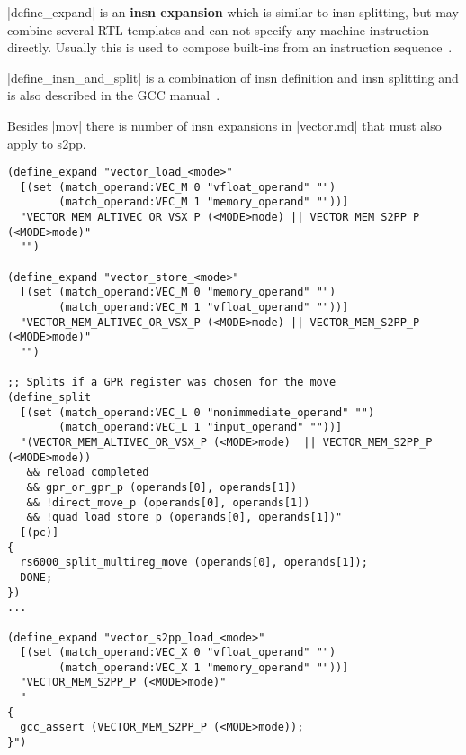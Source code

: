 |define_expand| is an \textbf{insn expansion} which is similar to insn splitting, but may combine several \ac{RTL} templates and can not specify any machine instruction directly.
Usually this is used to compose built-ins from an instruction sequence~\citep[ch.~16.15]{GCCint}.

|define_insn_and_split| is a combination of insn definition and insn splitting and is also described in the \ac{GCC} manual~\citep[ch.~16.16]{GCCint}.

Besides |mov| there is number of insn expansions in |vector.md| that must also apply to s2pp.
\begin{lstlisting}
(define_expand "vector_load_<mode>"
  [(set (match_operand:VEC_M 0 "vfloat_operand" "")
        (match_operand:VEC_M 1 "memory_operand" ""))]
  "VECTOR_MEM_ALTIVEC_OR_VSX_P (<MODE>mode) || VECTOR_MEM_S2PP_P (<MODE>mode)"
  "")

(define_expand "vector_store_<mode>"
  [(set (match_operand:VEC_M 0 "memory_operand" "")
        (match_operand:VEC_M 1 "vfloat_operand" ""))]
  "VECTOR_MEM_ALTIVEC_OR_VSX_P (<MODE>mode) || VECTOR_MEM_S2PP_P (<MODE>mode)"
  "")

;; Splits if a GPR register was chosen for the move
(define_split
  [(set (match_operand:VEC_L 0 "nonimmediate_operand" "")
        (match_operand:VEC_L 1 "input_operand" ""))]
  "(VECTOR_MEM_ALTIVEC_OR_VSX_P (<MODE>mode)  || VECTOR_MEM_S2PP_P (<MODE>mode))
   && reload_completed
   && gpr_or_gpr_p (operands[0], operands[1])
   && !direct_move_p (operands[0], operands[1])
   && !quad_load_store_p (operands[0], operands[1])"
  [(pc)]
{
  rs6000_split_multireg_move (operands[0], operands[1]);
  DONE;
})
...

(define_expand "vector_s2pp_load_<mode>"
  [(set (match_operand:VEC_X 0 "vfloat_operand" "")
        (match_operand:VEC_X 1 "memory_operand" ""))]
  "VECTOR_MEM_S2PP_P (<MODE>mode)"
  "
{
  gcc_assert (VECTOR_MEM_S2PP_P (<MODE>mode));
}")


\end{lstlisting}
